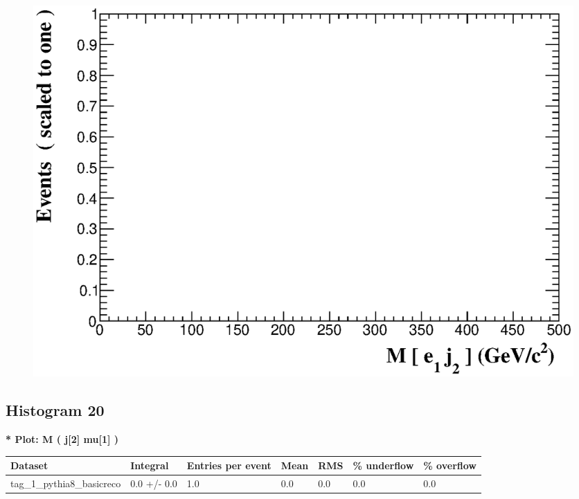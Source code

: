 \documentclass[a4paper, 10pt]{article}
\begin{document}
\begin{figure}[H]
  \begin{center}
    \includegraphics[scale=0.45]{selection_18.eps}\\
\caption{   }
  \end{center}
\end{figure}
      \newpage
\subsection{ Histogram 20}

\textbf{* Plot: M ( j[2] mu[1] ) }\\
   \begin{table}[H]
  \begin{center}
    \begin{tabular}{|m{23.0mm}|m{23.0mm}|m{18.0mm}|m{19.0mm}|m{19.0mm}|m{19.0mm}|m{19.0mm}|}
      \hline
      {\cellcolor{yellow}         Dataset}& {\cellcolor{yellow}         Integral}& {\cellcolor{yellow}         Entries per event}& {\cellcolor{yellow}         Mean}& {\cellcolor{yellow}         RMS}& {\cellcolor{yellow}         \% underflow}& {\cellcolor{yellow}         \% overflow}\\
      \hline
      {\cellcolor{white}         tag\_1\_pythia8\_basicreco}& {\cellcolor{white}         0.0 +/\-- 0.0}& {\cellcolor{white}         1.0}& {\cellcolor{white}         0.0}& {\cellcolor{white}         0.0}& {\cellcolor{green}         0.0}& {\cellcolor{green}         0.0}\\
\hline
    \end{tabular}
  \end{center}
\end{table}
\end{document}

